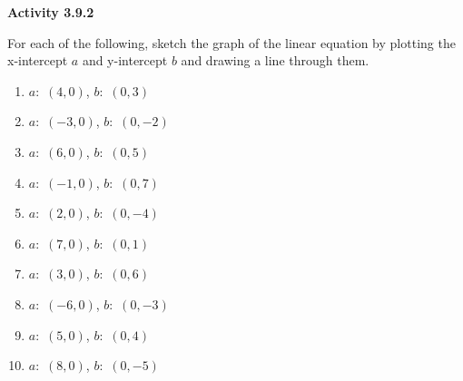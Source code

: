 \vspace{1ex}
\noindent\textbf{Activity 3.9.2}

\vspace{0.75ex}


For each of the following, sketch the graph of the linear equation by plotting the x-intercept $ a $ and y-intercept $b$  and drawing a line through them.
\begin{multicols}{2}
\begin{enumerate}[noitemsep, label = \color{blue}\arabic*. ]
    \item $ a:$  $(4, 0)$, $ b:$  $(0, 3)$
    \item $ a:$  $(-3, 0)$, $ b:$  $(0, -2)$
    \item $ a:$  $(6, 0)$, $ b:$  $(0, 5)$
    \item $ a:$  $(-1, 0)$, $ b:$  $(0, 7)$
    \item $ a:$  $(2, 0)$, $ b:$  $(0, -4)$
    \item $ a:$  $(7, 0)$, $ b:$  $(0, 1)$
    \item $ a:$  $(3, 0)$, $ b:$  $(0, 6)$
    \item $ a:$  $(-6, 0)$, $ b:$  $(0, -3)$
    \item $ a:$  $(5, 0)$, $ b:$  $(0, 4)$
    \item $ a:$  $(8, 0)$, $ b:$  $(0, -5)$
\end{enumerate}
\end{multicols}

